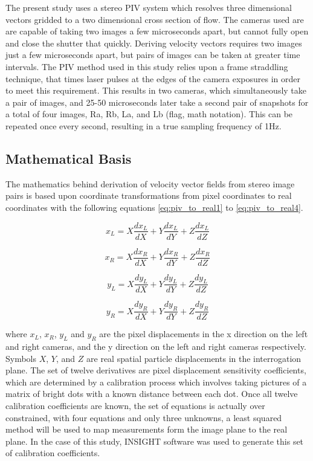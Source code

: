 The present study uses a stereo PIV system which resolves three dimensional 
vectors gridded to a two dimensional cross section of flow. The cameras used 
are  are capable of taking two images a few microseconds apart, 
but cannot fully open and close the shutter that quickly. Deriving velocity 
vectors requires two images just a few microseconds apart, but pairs of images 
can be taken at greater time intervals. The PIV method used in this study 
relies upon a frame straddling technique, that times laser pulses at the edges 
of the camera exposures in order to meet this requirement. This results in two 
cameras, which simultaneously take a pair of images, and 25-50 microseconds 
later take a second pair of snapshots for a total of four images, Ra, Rb, La, 
and Lb (flag, math notation). This can be repeated once every second, resulting 
in a true sampling frequency of 1Hz.

\subsection{Mathematical Basis}

The mathematics behind derivation of velocity vector fields from stereo image 
pairs is based upon coordinate transformations from pixel coordinates to real 
coordinates with the following equations 
\ref{eq:piv_to_real1} to \ref{eq:piv_to_real4}.

\begin{equation}
	x_L= X\frac{dx_L}{dX} + Y\frac{dx_L}{dY} + Z\frac{dx_L}{dZ}
	\label{eq:piv_to_real1}
\end{equation}

\begin{equation}
	x_R= X\frac{dx_R}{dX} + Y\frac{dx_R}{dY} + Z\frac{dx_R}{dZ}
	\label{eq:piv_to_real2}
\end{equation}

\begin{equation}
	y_L= X\frac{dy_L}{dX} + Y\frac{dy_L}{dY} + Z\frac{dy_L}{dZ}
	\label{eq:piv_to_real3}
\end{equation}

\begin{equation}
	y_R= X\frac{dy_R}{dX} + Y\frac{dy_R}{dY} + Z\frac{dy_R}{dZ}
	\label{eq:piv_to_real4}
\end{equation}

where $x_L$, $x_R$, $y_L$ and $y_R$ are the pixel displacements in the x 
direction on the left and right cameras, and the y direction on the left and 
right cameras respectively. Symbols $X$, $Y$, and $Z$ are real spatial particle 
displacements in the interrogation plane. The set of twelve derivatives are 
pixel displacement sensitivity coefficients, which are determined by a 
calibration process which involves taking pictures of a matrix of bright dots 
with a known distance between each dot. Once all twelve calibration 
coefficients are known, the set of equations is actually over constrained, with 
four equations and only three unknowns, a least squared method will be used to 
map measurements form the image plane to the real plane. In the case of this 
study, INSIGHT software was used to generate this set of calibration 
coefficients.

